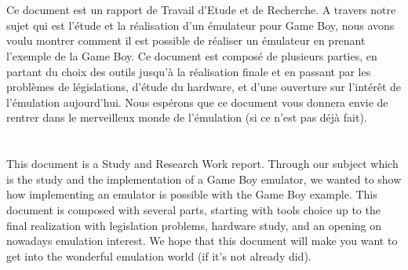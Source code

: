 \documentclass[french]{report}
\begin{document}
\section*{}
\vspace{2cm}
Ce document est un rapport de Travail d'Etude et de Recherche. A travers notre sujet qui est l'étude et la réalisation d'un émulateur pour Game Boy, nous avons voulu montrer comment il est possible de réaliser un émulateur en prenant l'exemple de la Game Boy. Ce document est composé de plusieurs parties, en partant du choix des outils jusqu'à la réalisation finale et en passant par les problèmes de législations, d'étude du hardware, et d'une ouverture sur l'intérêt de l'émulation aujourd'hui. Nous espérons que ce document vous donnera envie de rentrer dans le merveilleux monde de l'émulation (si ce n'est pas déjà fait). 
\\\\\\
This document is a Study and Research Work report. Through our subject which is the study and the implementation of a Game Boy emulator, we wanted to show how implementing an emulator is possible with the Game Boy example. This document is composed with several parts, starting with tools choice up to the final realization with legislation problems, hardware study, and an opening on nowadays emulation interest. We hope that this document will make you want to get into the wonderful emulation world (if it's not already did).
\end{document}
